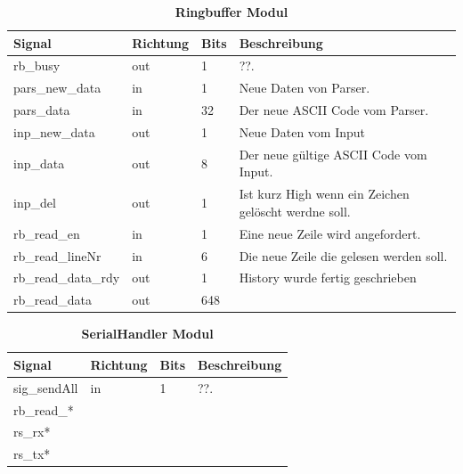 
\begin{table}[!h]
 \caption{\textbf{Ringbuffer Modul}}
 \begin{center}
  \begin{tabular}{|p{4cm}|p{}|p{1cm}|p{9cm}|}
   \hline Signal & Richtung & Bits & Beschreibung\\
   \hline
   rb\_busy & out & 1 & ??.\\
   pars\_new\_data & in & 1 & Neue Daten von Parser.\\
   pars\_data & in & 32 & Der neue ASCII Code vom Parser.\\
   inp\_new\_data & out & 1 & Neue Daten vom Input\\
   inp\_data & out & 8 & Der neue gültige ASCII Code vom Input.\\
   inp\_del & out & 1 & Ist kurz High wenn ein Zeichen gelöscht werdne soll.\\
   rb\_read\_en & in & 1 & Eine neue Zeile wird angefordert.\\
   rb\_read\_lineNr & in & 6 & Die neue Zeile die gelesen werden soll.\\
   rb\_read\_data\_rdy & out & 1 & History wurde fertig geschrieben\\
   rb\_read\_data &out & 648 & \\
   \hline
  \end{tabular}
 \end{center}
\end{table}


\begin{table}[!h]
\caption{\textbf{SerialHandler Modul}}
 \begin{center}
  \begin{tabular}{|p{4cm}|p{}|p{1cm}|p{9cm}|}
   \hline Signal & Richtung & Bits & Beschreibung\\
   \hline
   sig\_sendAll & in & 1 & ??.\\
   rb\_read\_* & & & \\
   rs\_rx* &&&\\
   rs\_tx* &&&\\
   \hline
  \end{tabular}
 \end{center} 
\end{table}


